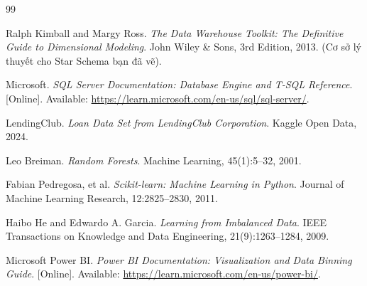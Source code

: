 
{} %

\begin{thebibliography}{99}

    Ralph Kimball and Margy Ross.
    \textit{The Data Warehouse Toolkit: The Definitive Guide to Dimensional Modeling}.
    John Wiley \& Sons, 3rd Edition, 2013. (Cơ sở lý thuyết cho Star Schema bạn đã vẽ).

    Microsoft.
    \textit{SQL Server Documentation: Database Engine and T-SQL Reference}.
    [Online]. Available: \url{https://learn.microsoft.com/en-us/sql/sql-server/}.

    LendingClub.
    \textit{Loan Data Set from LendingClub Corporation}.
    Kaggle Open Data, 2024.

    Leo Breiman.
    \textit{Random Forests}.
    Machine Learning, 45(1):5--32, 2001.

    Fabian Pedregosa, et al.
    \textit{Scikit-learn: Machine Learning in Python}.
    Journal of Machine Learning Research, 12:2825--2830, 2011.

    Haibo He and Edwardo A. Garcia.
    \textit{Learning from Imbalanced Data}.
    IEEE Transactions on Knowledge and Data Engineering, 21(9):1263--1284, 2009.

    Microsoft Power BI.
    \textit{Power BI Documentation: Visualization and Data Binning Guide}.
    [Online]. Available: \url{https://learn.microsoft.com/en-us/power-bi/}.

\end{thebibliography}